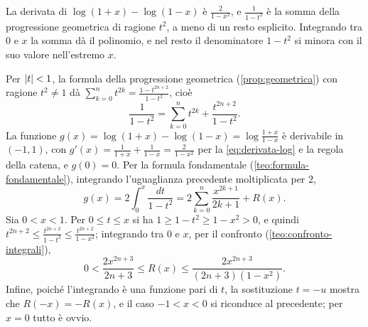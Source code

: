 \begin{schema}
\end{schema}

\begin{strategia}
La derivata di $\log(1+x)-\log(1-x)$ è $\frac2{1-x^{2}}$, e $\frac1{1-t^{2}}$ è la somma della
progressione geometrica di ragione $t^{2}$, a meno di un resto esplicito. Integrando tra $0$
e $x$ la somma dà il polinomio, e nel resto il denominatore $1-t^{2}$ si minora con il suo
valore nell'estremo $x$.
\end{strategia}

\begin{dimostrazione}
Per $\lvert t\rvert<1$, la formula della progressione geometrica (\cref{prop:geometrica}) con
ragione $t^{2}\neq1$ dà $\sum_{k=0}^{n}t^{2k}=\frac{1-t^{2n+2}}{1-t^{2}}$, cioè
\[
  \frac1{1-t^{2}}=\sum_{k=0}^{n}t^{2k}+\frac{t^{2n+2}}{1-t^{2}} .
\]
La funzione $g(x)=\log(1+x)-\log(1-x)=\log\frac{1+x}{1-x}$ è derivabile in $(-1,1)$, con
$g'(x)=\frac1{1+x}+\frac1{1-x}=\frac2{1-x^{2}}$ per la \eqref{eq:derivata-log} e la regola della catena,
e $g(0)=0$. Per la formula fondamentale (\cref{teo:formula-fondamentale}), integrando
l'uguaglianza precedente moltiplicata per $2$,
\[
  g(x)=2\int_{0}^{x}\frac{dt}{1-t^{2}}=2\sum_{k=0}^{n}\frac{x^{2k+1}}{2k+1}+R(x) .
\]
Sia $0<x<1$. Per $0\le t\le x$ si ha $1\ge1-t^{2}\ge1-x^{2}>0$, e quindi
$t^{2n+2}\le\frac{t^{2n+2}}{1-t^{2}}\le\frac{t^{2n+2}}{1-x^{2}}$; integrando tra $0$ e $x$, per il
confronto (\cref{teo:confronto-integrali}),
\[
  0<\frac{2x^{2n+3}}{2n+3}\le R(x)\le\frac{2x^{2n+3}}{(2n+3)(1-x^{2})} .
\]
Infine, poiché l'integrando è una funzione pari di $t$, la
sostituzione $t=-u$ mostra che $R(-x)=-R(x)$, e il caso $-1<x<0$ si riconduce al
precedente; per $x=0$ tutto è ovvio.
\end{dimostrazione}

